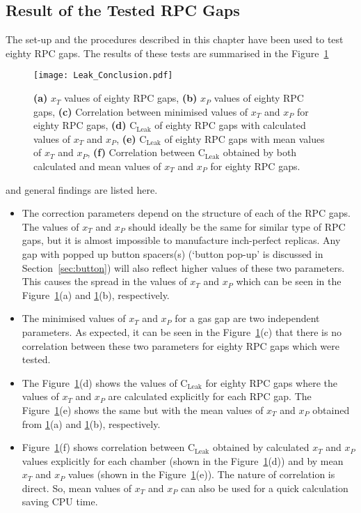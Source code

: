 \subsection{Result of the Tested RPC Gaps}
The set-up and the procedures described in this chapter have been
used to test eighty RPC gaps. The results of these tests are
summarised in the Figure~\ref{fig:conclusion}
\begin{figure}[h]
  \centering
  \texttt{[image: Leak\_Conclusion.pdf]}
  \caption{\textbf{(a)} $x_T$ values of eighty RPC gaps,
    \textbf{(b)} $x_P$ values of eighty RPC gaps,
    \textbf{(c)} Correlation between minimised values of $x_T$ and $x_P$
    for eighty RPC gaps,
    \textbf{(d)} $\textrm{C}_{\textrm{Leak}}$ of eighty RPC gaps with calculated
    values of $x_T$ and $x_P$,
    \textbf{(e)} $\textrm{C}_{\textrm{Leak}}$ of eighty RPC gaps with mean
    values of $x_T$ and $x_P$,
    \textbf{(f)} Correlation between $\textrm{C}_{\textrm{Leak}}$ obtained by
    both calculated and mean values of $x_T$ and $x_P$ for eighty RPC gaps.}
  \label{fig:conclusion}
\end{figure}
and general findings are listed here.
\begin{itemize} \itemsep -3pt
\item The correction parameters depend on the structure of each of the
  RPC gaps. The values of $x_T$ and $x_P$ should ideally be the same
  for similar type of RPC gaps, but it is almost impossible to
  manufacture inch-perfect replicas. Any gap with popped up button
  spacers(s) (`button pop-up' is discussed in Section~\ref{sec:button})
  will also reflect higher values of these two parameters. This causes
  the spread in the values of $x_T$ and $x_P$ which can be seen in
  the Figure~\ref{fig:conclusion}(a) and \ref{fig:conclusion}(b),
  respectively.
\item The minimised values of $x_T$ and $x_P$ for a gas gap are two independent
  parameters. As expected, it can be seen in the Figure~\ref{fig:conclusion}(c)
  that there is no correlation between these two parameters for eighty RPC gaps
  which were tested.
\item The Figure~\ref{fig:conclusion}(d) shows the values of
  $\textrm{C}_{\textrm{Leak}}$ for eighty RPC gaps where the values of $x_T$ and
  $x_P$ are calculated explicitly for each RPC gap. The
  Figure~\ref{fig:conclusion}(e) shows the same but with the mean values of
  $x_T$ and $x_P$ obtained from \ref{fig:conclusion}(a) and
  \ref{fig:conclusion}(b), respectively.
\item Figure~\ref{fig:conclusion}(f) shows correlation between
  $\textrm{C}_{\textrm{Leak}}$ obtained by calculated $x_T$ and $x_P$ values
  explicitly for each chamber (shown in the Figure~\ref{fig:conclusion}(d))
  and by mean $x_T$ and $x_P$ values (shown in the
  Figure~\ref{fig:conclusion}(e)). The nature of correlation is direct.
  So, mean values of $x_T$ and $x_P$ can also be used for a quick calculation
  saving CPU time.
\end{itemize}

